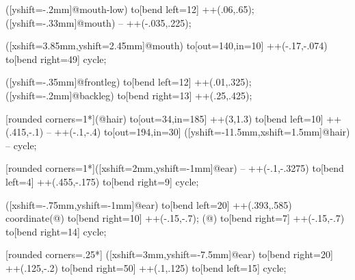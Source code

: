 { ([yshift=-.2mm]@mouth-low) to[bend left=12] ++(.06,.65);
 ([yshift=-.33mm]@mouth) -- ++(-.035,.225);

 ([xshift=3.85mm,yshift=2.45mm]@mouth) to[out=140,in=10] ++(-.17,-.074) to[bend right=49] cycle;

 ([yshift=-.35mm]@frontleg) to[bend left=12] ++(.01,.325);
 ([yshift=-.2mm]@backleg) to[bend right=13] ++(.25,.425);

 [rounded corners=1*\pingu@@horse@scale](@hair) to[out=34,in=185] ++(3,1.3) to[bend left=10] ++(.415,-.1) -- ++(-.1,-.4) to[out=194,in=30] ([yshift=-11.5mm,xshift=1.5mm]@hair) -- cycle;

 [rounded corners=1*\pingu@@horse@scale]([xshift=2mm,yshift=-1mm]@ear) -- ++(-.1,-.3275) to[bend left=4] ++(.455,-.175) to[bend right=9] cycle;

 ([xshift=-.75mm,yshift=-1mm]@ear) to[bend left=20] ++(.393,.585) coordinate(@) to[bend right=10] ++(-.15,-.7);
 (@) to[bend right=7] ++(-.15,-.7) to[bend right=14] cycle;


 [rounded corners=.25*\pingu@@horse@scale] ([xshift=3mm,yshift=-7.5mm]@ear) to[bend right=20] ++(.125,-.2) to[bend right=50] ++(.1,.125) to[bend left=15] cycle;
}


